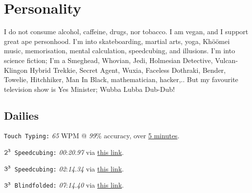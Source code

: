 \documentclass[12pt,a4paper,oneside]{article}
\begin{document}
\section{Personality}
I do not consume alcohol, caffeine, drugs, nor tobacco.
I am vegan, and I support great ape personhood.
I'm into skateboarding, martial arts, yoga, Khöömei music, memorisation, mental calculation, speedcubing, and illusions.
I'm into science fiction; I'm a Smeghead, Whovian, Jedi, Holmesian Detective, Vulcan-Klingon Hybrid Trekkie, Secret Agent, Wuxia, Faceless Dothraki, Bender, Towelie, Hitchhiker, Man In Black, mathematician, hacker,.. But my favourite television show is Yes Minister; Wubba Lubba Dub-Dub!%

\subsection{Dailies}
\item \texttt{Touch Typing\phantom{ng}:} \textit{65} WPM @ \textit{99}\% accuracy, over \href{https://www.typing.com/student/test/5}{5 minutes}.%
\item \texttt{$\text{\texttt{2}}^\text{\texttt{3}}$ Speedcubing:} \textit{00}:\textit{20}.\textit{97} via \href{http://www.cubetimer.com/}{this link}.
\item \texttt{$\text{\texttt{3}}^\text{\texttt{3}}$ Speedcubing:} \textit{02}:\textit{14}.\textit{34} via \href{http://www.cubetimer.com/}{this link}.
\item \texttt{$\text{\texttt{3}}^\text{\texttt{3}}$ Blindfolded:} \textit{07}:\textit{14}.\textit{40} via \href{http://www.cubetimer.com/}{this link}.
\end{document}
